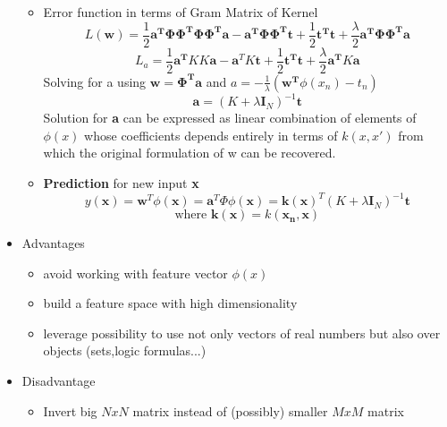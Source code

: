 \documentclass[12pt]{article} %
\begin{document}
\begin{itemize}
\begin{itemize}
\item Error function in terms of Gram Matrix of Kernel 
$$ L(\bm{w}) = \frac{1}{2} \bm{a^T \Phi\Phi^T\Phi\Phi^Ta - a^T\Phi\Phi^Tt}+ \frac{1}{2} \bm{t^Tt} + \frac{\lambda}{2}\bm{a^T\Phi\Phi^Ta}$$
$$ L_a = \frac{1}{2} \bm{a^T}KK\bm{a} - \bm{a}^TK \bm{t} + \frac{1}{2}\bm{t^Tt} + \frac{\lambda}{2} \bm{a^T}K\bm{a}$$
Solving for a using $\bm{w = \Phi^Ta}$ and $a = -\frac{1}{\lambda}(\bm{w^T}\phi(x_n)-t_n)$
$$ \bm{a} = (K+\lambda \bm{I}_N)^{-1}\bm{t}$$
Solution for \textbf{a} can be expressed as linear combination of elements of $\phi(x)$ whose coefficients depends entirely in terms of $k(x,x')$ from which the original formulation of w can be recovered.

\item \textbf{Prediction} for new input \textbf{x}
$$ y(\bm{x}) = \bm{w}^T\phi(\bm{x}) = \bm{a}^T\Phi \phi(\bm{x})= \bm{k}(\bm{x})^T(K+ \lambda \bm{I}_N)^{-1}\bm{t}$$
$$ \text{where } \bm{k(x)} = k(\bm{x_n,x}) $$
\end{itemize}

\item Advantages
\begin{itemize}
\item avoid working with feature vector $\phi(x)$
\item build a feature space with high dimensionality
\item leverage possibility to use not only vectors of real numbers but also over objects (sets,logic formulas...)
\end{itemize}

\item Disadvantage
\begin{itemize}
\item Invert big $N x N$ matrix instead of (possibly) smaller $M x M$ matrix
\end{itemize}
\end{itemize}
\end{document}
